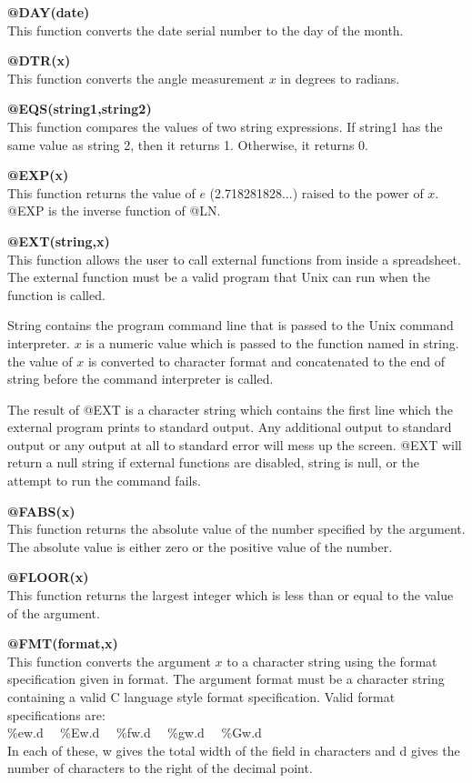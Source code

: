 {\bf @DAY(date)}\\
    This function converts the date serial number to the day of the month.

{\bf @DTR(x)}\\
    This function converts the angle measurement $x$ in degrees to radians.

{\bf @EQS(string1,string2)}\\
    This function compares the values of two string expressions.  If string1 
has the same value as string 2, then it returns 1.  Otherwise, it returns 0.

{\bf @EXP(x)}\\
    This function returns the value of $e$ (2.718281828...) raised to the power 
of $x$.  @EXP is the inverse function of @LN.

{\bf @EXT(string,x)}\\
    This function allows the user to call external functions from inside a 
spreadsheet.  The external function must be a valid program that Unix can run 
when the function is called.

    String contains the program command line that is passed to the Unix 
command interpreter.  $x$ is a numeric value which is passed to the function 
named in string.  the value of $x$ is converted to character format and 
concatenated to the end of string before the command interpreter is called.

    The result of @EXT is a character string which contains the first line 
which the external program prints to standard output.  Any additional output 
to standard output or any output at all to standard error will mess up the 
screen.  @EXT will return a null string if external functions are disabled, 
string is null, or the attempt to run the command fails.

{\bf @FABS(x)}\\
    This function returns the absolute value of the number specified by the 
argument.  The absolute value is either zero or the positive value of the 
number.

{\bf @FLOOR(x)}\\
    This function returns the largest integer which is less than or equal to 
the value of the argument.

{\bf @FMT(format,x)}\\
    This function converts the argument $x$ to a character string using the 
format specification given in format.  The argument format must be a character 
string containing a valid C language style format specification.  Valid format 
specifications are: \\
    \%ew.d  \ \     \%Ew.d   \ \    \%fw.d  \ \     \%gw.d  \ \     \%Gw.d\\
In each of these, w gives the total width of the field in characters and d 
gives the number of characters to the right of the decimal point.

